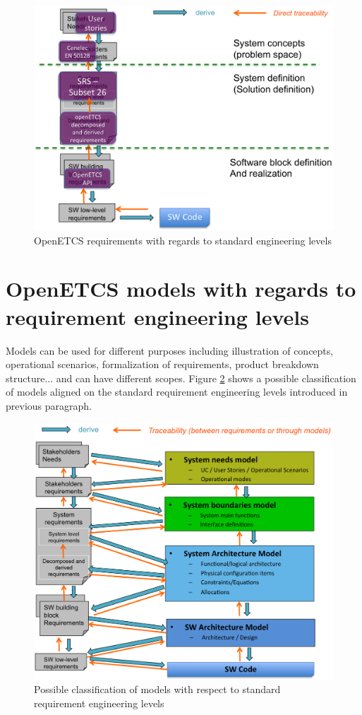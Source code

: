 \documentclass[11pt]{template/openetcs_report}
\begin{document}
\begin{figure} [htb]
\centering
\includegraphics[width=.9\linewidth]
{./images/OpenETCSRequirementsWrtStandard.png}
\caption{\label{fig:OpenETCSRequirementsWrtStandard}OpenETCS requirements with regards to standard engineering levels}
\end{figure} 


\section{OpenETCS models with regards to requirement engineering levels}
\label{sec-2}

Models can be used for different purposes including illustration of concepts, operational scenarios, formalization of requirements, product breakdown structure... and can have different scopes. Figure \ref{fig:requirementEngineeringWithModels}
shows a possible classification of models aligned on the standard requirement engineering levels introduced in previous paragraph.

\begin{figure}[htb]
\centering
\includegraphics[width=.9\linewidth]
{./images/requirementEngineeringWithModels.png}
\caption{\label{fig:requirementEngineeringWithModels}Possible classification of models with respect to standard requirement engineering levels}
\end{figure}
\end{document}

